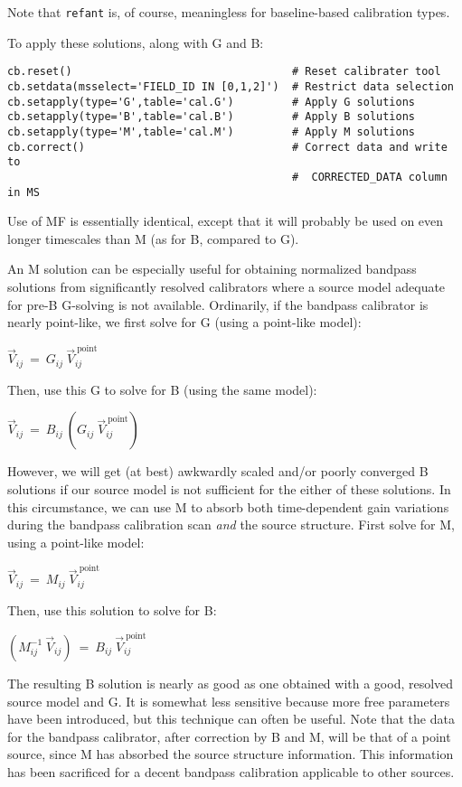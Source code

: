 Note that {\tt refant} is, of course, meaningless for baseline-based
calibration types.

To apply these solutions, along with G and B:

\small
\begin{verbatim}
cb.reset()                                  # Reset calibrater tool
cb.setdata(msselect='FIELD_ID IN [0,1,2]')  # Restrict data selection
cb.setapply(type='G',table='cal.G')         # Apply G solutions
cb.setapply(type='B',table='cal.B')         # Apply B solutions
cb.setapply(type='M',table='cal.M')         # Apply M solutions
cb.correct()                                # Correct data and write to
                                            #  CORRECTED_DATA column in MS
\end{verbatim}
\normalsize


Use of MF is essentially identical, except that it will probably be
used on even longer timescales than M (as for B, compared to G).

An M solution can be especially useful for obtaining normalized
bandpass solutions from significantly resolved calibrators where a
source model adequate for pre-B G-solving is not available.  Ordinarily,
if the bandpass calibrator is nearly point-like, we first solve for G (using
a point-like model):

$ \vec{V}_{ij}~=~G_{ij}~\vec{V}_{ij}^{\mathrm{~point}} $

Then, use this G to solve for B (using the same model):

$ \vec{V}_{ij}~=~B_{ij}~\left(G_{ij}~\vec{V}_{ij}^{\mathrm{~point}}\right) $

However, we will get (at best) awkwardly scaled and/or poorly
converged B solutions if our source model is not sufficient for the
either of these solutions.  In this circumstance, we can use M to
absorb both time-dependent gain variations during the bandpass
calibration scan {\it and} the source structure.  First solve for M,
using a point-like model:

$ \vec{V}_{ij}~=~M_{ij}~\vec{V}_{ij}^{\mathrm{~point}} $

Then, use this solution to solve for B:

$ \left(M_{ij}^{-1}~\vec{V}_{ij}\right)~=~B_{ij}~\vec{V}_{ij}^{\mathrm{~point}} $

The resulting B solution is nearly as good as one obtained with a
good, resolved source model and G.  It is somewhat less sensitive
because more free parameters have been introduced, but this technique
can often be useful.  Note that the data for the bandpass calibrator,
after correction by B and M, will be that of a point source, since
M has absorbed the source structure information.  This information has
been sacrificed for a decent bandpass calibration applicable to other
sources.

